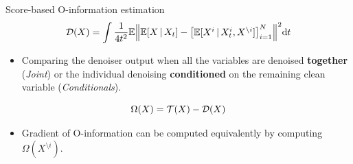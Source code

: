 \documentclass{beamer}
\begin{document}


\begin{frame}{Score-based O-information estimation}
\begin{equation*}
\mathcal{D}(X)  = \int \frac{1}{4t^2}\mathbb{E}\norm{\mathbb{E}[X\,|\, X_t]-
        \begin{bmatrix}
            \mathbb{E}[X^i\,|\, X^i_t, X^{\setminus i}]
        \end{bmatrix}_{i=1}^{N}}^2\dd t 
 \end{equation*}

\begin{itemize}
    \item Comparing the denoiser output when all the variables are denoised \textbf{together} (\textit{Joint}) or the individual denoising \textbf{conditioned} on the remaining clean variable (\textit{Conditionals}).
\end{itemize}


\begin{equation*}
  \Omega(X)=\mathcal{T}(X)-\mathcal{D}(X)
\end{equation*}


\begin{itemize}
    \item Gradient of O-information can be computed equivalently by computing $\Omega(X^{\setminus i})$.
\end{itemize}
\end{frame}

\end{document}
